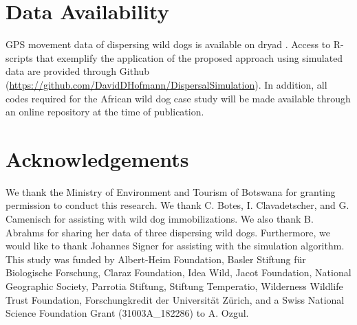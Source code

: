 \documentclass[abstract=on,10pt,a4paper,bibliography=totocnumbered]{article}
\begin{document}
\section{Data Availability}
GPS movement data of dispersing wild dogs is available on dryad
\citep{Hofmann.2021b}. Access to R-scripts that exemplify the application of the
proposed approach using simulated data are provided through Github
(\url{https://github.com/DavidDHofmann/DispersalSimulation}). In addition, all
codes required for the African wild dog case study will be made available
through an online repository at the time of publication.

\section{Acknowledgements}
We thank the Ministry of Environment and Tourism of Botswana for granting
permission to conduct this research. We thank C. Botes, I. Clavadetscher, and G.
Camenisch for assisting with wild dog immobilizations. We also thank B. Abrahms
for sharing her data of three dispersing wild dogs. Furthermore, we would like
to thank Johannes Signer for assisting with the simulation algorithm. This study
was funded by Albert-Heim Foundation, Basler Stiftung für Biologische Forschung,
Claraz Foundation, Idea Wild, Jacot Foundation, National Geographic Society,
Parrotia Stiftung, Stiftung Temperatio, Wilderness Wildlife Trust Foundation,
Forschungkredit der Universität Zürich, and a Swiss National Science Foundation
Grant (31003A\_182286) to A. Ozgul.

\newpage
\begingroup
\singlespacing

\endgroup
\end{document}
